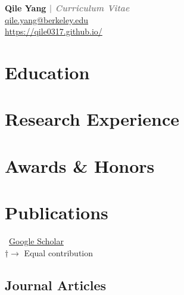 \documentclass[11pt]{article} %
\newcommand{\mytitle}[4]{
  \begin{center}
    \Large\textbf{#1}\normalsize \\ %
    \href{mailto:#2}{#2} \\ %
    \href{https://#3}{#3} \\ %
    #4 %
  \end{center}
}
\newcommand{\myinput}[1]{
  
}
\newcommand{\socialicon}[2]{
  \hypersetup{hidelinks}
  \href{https://#2}{#1}
  \hypersetup{hidelinks=false}
}
\begin{document}

\mytitle{
  Qile Yang \textcolor{gray}{| \emph{Curriculum Vitae}}
}{
  qile.yang@berkeley.edu
}{
  https://qile0317.github.io/
}{
  \socialicon{\faGithub}{github.com/Qile0317}
  \socialicon{\faLinkedin}{linkedin.com/in/qile0317}
  \socialicon{\faGoogle}{scholar.google.com/citations?user=IsJeImQAAAAJ&hl=en}
  \socialicon{\faOrcid}{orcid.org/my-orcid?orcid=0009-0005-0148-2499}
}

\RaggedRight


\section*{Education}
\myinput{education.tex}

\section*{Research Experience}
\label{exp_research}
\myinput{exp_research.tex}

\section*{Awards \& Honors}
\label{awards}
\myinput{awards.tex}


\section*{Publications}
\label{pubs}

\vspace{-.75em}
\small
\faGoogle~\href{https://scholar.google.com/}{Google Scholar}\\
$\dagger \rightarrow$ Equal contribution
\normalsize


\subsection*{Journal Articles}
\label{journal-article}
\newrefcontext[labelprefix=J] %
\nocite{*} %
\printbibliography[
    type=article, %
    heading=none, %
    resetnumbers=true, %
    keyword=J %
]
\end{document}
